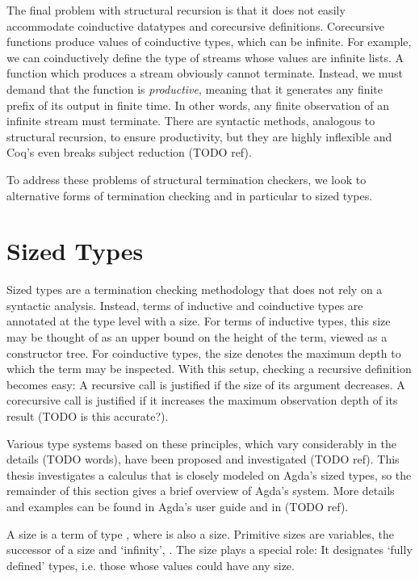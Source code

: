 The final problem with structural recursion is that it does not easily
accommodate coinductive datatypes and corecursive definitions. Corecursive
functions produce values of coinductive types, which can be infinite. For
example, we can coinductively define the type of streams whose values are
infinite lists. A function which produces a stream obviously cannot terminate.
Instead, we must demand that the function is \emph{productive}, meaning that it
generates any finite prefix of its output in finite time. In other words, any
finite observation of an infinite stream must terminate. There are syntactic
methods, analogous to structural recursion, to ensure productivity, but they are
highly inflexible and Coq's even breaks subject reduction (TODO ref).

To address these problems of structural termination checkers, we look to
alternative forms of termination checking and in particular to sized types.


\section{Sized Types}
\label{sec:background:sized}

Sized types are a termination checking methodology that does not rely on a
syntactic analysis. Instead, terms of inductive and coinductive types are
annotated at the type level with a size. For terms of inductive types, this size
may be thought of as an upper bound on the height of the term, viewed as a
constructor tree. For coinductive types, the size denotes the maximum depth to
which the term may be inspected. With this setup, checking a recursive
definition becomes easy: A recursive call is justified if the size of its
argument decreases. A corecursive call is justified if it increases the maximum
observation depth of its result (TODO is this accurate?).

Various type systems based on these principles, which vary considerably in the
details (TODO words), have been proposed and investigated (TODO ref). This
thesis investigates a calculus that is closely modeled on Agda's sized types, so
the remainder of this section gives a brief overview of Agda's system. More
details and examples can be found in Agda's user guide and in (TODO ref).

A size is a term of type , where  is also a size.
Primitive sizes are variables, the successor of a size  and
\enquote*{infinity}, . The size  plays a special role: It
designates \enquote*{fully defined} types, i.e. those whose values could have any
size.

